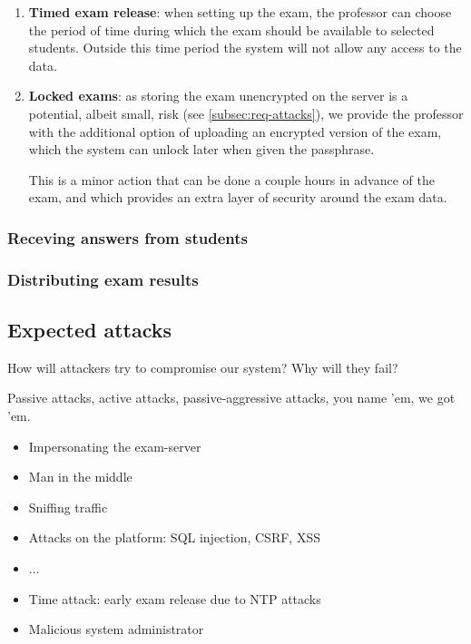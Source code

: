 \documentclass{article}
\begin{document}
\begin{enumerate}

\item \textbf{Timed exam release}: when setting up the exam, the professor can
choose the period of time during which the exam should be available to selected
students. Outside this time period the system will not allow any access to the
data.

\item \textbf{Locked exams}: as storing the exam unencrypted on the server is a
potential, albeit small, risk (see \autoref{subsec:req-attacks}), we provide the
professor with the additional option of uploading an encrypted version of the
exam, which the system can unlock later when given the passphrase.

This is a minor action that can be done a couple hours in advance of the exam,
and which provides an extra layer of security around the exam data.

\end{enumerate}


\subsubsection{Receving answers from students}

\subsubsection{Distributing exam results}

\subsection{Expected attacks}
\label{subsec:req-attacks}

How will attackers try to compromise our system? Why will they fail?

Passive attacks, active attacks, passive-aggressive attacks, you name 'em, we
got 'em.

\begin{itemize}
\item Impersonating the exam-server
\item Man in the middle
\item Sniffing traffic
\item Attacks on the platform: SQL injection, CSRF, XSS
\item ...
\item Time attack: early exam release due to NTP attacks
\item Malicious system administrator
\end{itemize}
\end{document}
